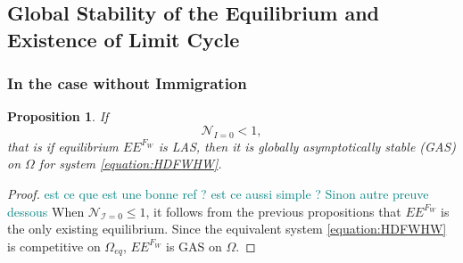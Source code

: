 \documentclass{article}
\newcommand{\cI}{\mathcal{I}}
\newcommand{\marc}[1]{\textcolor{teal}{#1}}
\newtheorem{prop}{Proposition}
\begin{document}
\subsection{Global Stability of the Equilibrium and Existence of Limit Cycle}

\subsubsection{In the case without Immigration}

\begin{prop}\label{prop:EEFGAS}If 
$$
\mathcal{N}_{I =0} < 1,
$$
that is if equilibrium $EE^{F_W}$ is LAS, then it is globally asymptotically stable (GAS) on $\Omega$ for system \eqref{equation:HDFWHW}.
\end{prop}

\begin{proof} \marc{est ce que \cite{anguelov_monotone_2010} est une bonne ref ? est ce aussi simple ? Sinon autre preuve dessous}
When $\mathcal{N}_{\cI = 0} \leq 1$, it follows from the previous propositions that $EE^{F_W}$ is the only existing equilibrium. Since the equivalent system \eqref{equation:HDFWHW} is competitive on $\Omega_{eq}$, $EE^{F_W}$ is GAS on $\Omega$.
\end{proof}
\end{document}

